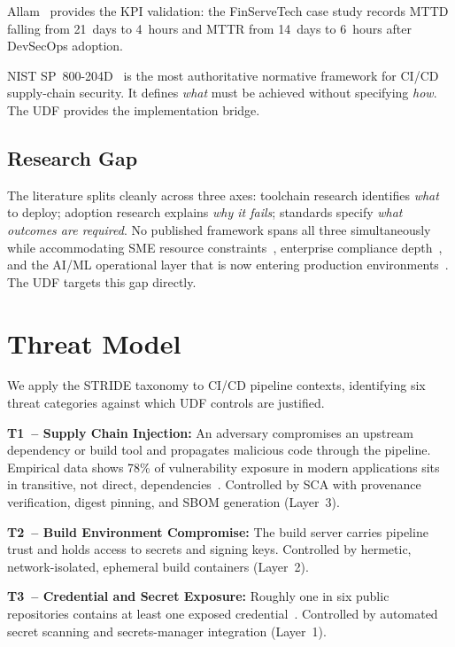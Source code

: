 \documentclass[letterpaper, 10pt, conference]{ieeeconf}
\begin{document}
Allam~\cite{allam2022} provides the KPI validation: the FinServeTech
case study records MTTD falling from 21~days to 4~hours and MTTR from
14~days to 6~hours after DevSecOps adoption.

NIST SP~800-204D~\cite{nist2024} is the most authoritative normative
framework for CI/CD supply-chain security. It defines \emph{what} must
be achieved without specifying \emph{how}. The UDF provides the
implementation bridge.

\subsection{Research Gap}

The literature splits cleanly across three axes: toolchain research
identifies \emph{what} to deploy; adoption research explains \emph{why
it fails}; standards specify \emph{what outcomes are required}. No
published framework spans all three simultaneously while accommodating
SME resource constraints~\cite{cheenepalli2025}, enterprise compliance
depth~\cite{nist2024}, and the AI/ML operational layer that is now
entering production environments~\cite{thota2024}. The UDF targets
this gap directly.

\section{Threat Model}

We apply the STRIDE taxonomy to CI/CD pipeline contexts, identifying six
threat categories against which UDF controls are justified.

\textbf{T1~-- Supply Chain Injection:} An adversary compromises an
upstream dependency or build tool and propagates malicious code through
the pipeline. Empirical data shows 78\% of vulnerability exposure in
modern applications sits in transitive, not direct,
dependencies~\cite{singh2020}. Controlled by SCA with provenance
verification, digest pinning, and SBOM generation (Layer~3).

\textbf{T2~-- Build Environment Compromise:} The build server carries
pipeline trust and holds access to secrets and signing keys. Controlled
by hermetic, network-isolated, ephemeral build containers (Layer~2).

\textbf{T3~-- Credential and Secret Exposure:} Roughly one in six
public repositories contains at least one exposed
credential~\cite{singh2020}. Controlled by automated secret scanning
and secrets-manager integration (Layer~1).
\end{document}
